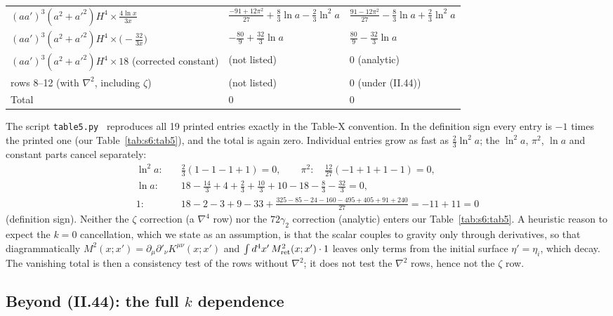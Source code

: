 \documentclass[aps,prd,onecolumn,10pt,nofootinbib,floatfix]{revtex4-2}
\newcommand{\eqII}[1]{(II.#1)}
\begin{document}
\begin{table}[htbp]
\begin{ruledtabular}
\begin{tabular}{l l l}
$(aa')^3(a^2{+}a'^2)H^4\times\frac{4\ln x}{3x}$ & $\frac{-91+12\pi^2}{27}+\frac83\ln a-\frac23\ln^2a$ &
$\frac{91-12\pi^2}{27}-\frac83\ln a+\frac23\ln^2a$\\
$(aa')^3(a^2{+}a'^2)H^4\times\big(-\frac{32}{3x}\big)$ & $-\frac{80}9+\frac{32}3\ln a$ & $\frac{80}9-\frac{32}3\ln a$\\
$(aa')^3(a^2{+}a'^2)H^4\times18$ (corrected constant) & (not listed) & $0$ (analytic)\\
rows 8--12 (with $\nabla^2$, including $\zeta$) & (not listed) & $0$ (under \eqII{44})\\
\hline
Total & $0$ & $0$\\
\end{tabular}
\end{ruledtabular}
\end{table}

The script \texttt{table5.py}~\cite{ref:repo} reproduces all 19 printed entries exactly in the Table-X convention. In the
definition sign every entry is $-1$ times the printed one (our Table~\ref{tab:s6:tab5}), and the total is again zero.
Individual entries grow as fast as $\frac23\ln^2a$; the $\ln^2a$, $\pi^2$, $\ln a$ and constant parts cancel separately:
\begin{equation}
\begin{aligned}
\ln^2a:&\quad\tfrac23(1-1-1+1)=0,\qquad \pi^2:\quad\tfrac{12}{27}(-1+1+1-1)=0,\\
\ln a:&\quad 18-\tfrac{14}3+4+\tfrac23+\tfrac{10}3+10-18-\tfrac83-\tfrac{32}3=0,\\
1:&\quad 18-2-3+9-33+\tfrac{325-85-24-160-495+405+91+240}{27}=-11+11=0
\end{aligned}
\label{eq:s6:t5sums}
\end{equation}
(definition sign). Neither the $\zeta$ correction (a $\nabla^4$ row) nor the $72\gamma_2$ correction (analytic) enters
our Table~\ref{tab:s6:tab5}. A heuristic reason to expect the $k=0$ cancellation, which we state as an assumption, is that
the scalar couples to gravity only through derivatives, so that diagrammatically $M^2(x;x')=\partial_\mu\partial'_\nu
K^{\mu\nu}(x;x')$ and $\int d^4x'\,M^2_{\rm ret}(x;x')\cdot1$ leaves only terms from the initial surface $\eta'=\eta_i$,
which decay. The vanishing total is then a consistency test of the rows without $\nabla^2$; it does not test the
$\nabla^2$ rows, hence not the $\zeta$ row.

\subsection{Beyond (II.44): the full \texorpdfstring{$k$}{k} dependence}
\label{sec:s6:beyond}
\end{document}
